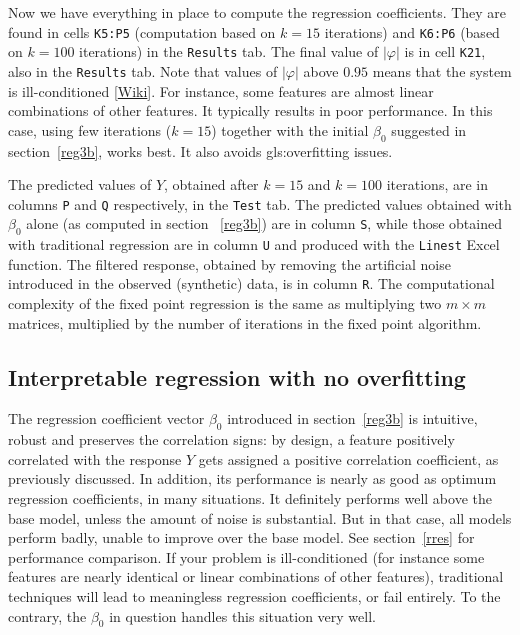 \documentclass[oneside,10pt]{book}
\begin{document}
Now we have everything in place to compute the regression coefficients. They are found in cells \texttt{K5:P5} (computation based on $k=15$ iterations) and  \texttt{K6:P6} (based on $k=100$ iterations) in the \texttt{Results} tab. The final value of $|\varphi|$ is in cell \texttt{K21}, also in the \texttt{Results} tab. Note that values of $|\varphi|$ above $0.95$ means that the system is \textcolor{index}{ill-conditioned} [\href{https://en.wikipedia.org/wiki/Condition_number}{Wiki}]. For instance, some features are almost linear combinations of other features. It typically results in poor performance. In this case, using few iterations ($k=15$) together with the initial $\beta_0$ suggested in section~\ref{reg3b}, works best. It also avoids \gls{gls:overfitting} issues.

The predicted values of $Y$, obtained after $k=15$ and $k=100$ iterations, are in columns \texttt{P} and \texttt{Q} respectively, in the \texttt{Test} tab. The predicted values obtained with $\beta_0$ alone (as computed in section ~\ref{reg3b}) are in column \texttt{S}, while those obtained with traditional regression are in column \texttt{U} and produced with the \texttt{Linest} Excel function. The filtered response, obtained by removing the artificial noise introduced in the observed (synthetic) data, is in column \texttt{R}. The computational complexity of the fixed point regression is the same as multiplying two $m\times m$ matrices, multiplied by the number of iterations in the fixed point algorithm. 


\subsection{Interpretable regression with no overfitting}

The regression coefficient vector $\beta_0$ introduced in section~\ref{reg3b} is intuitive, robust and preserves the correlation signs: by design, a feature positively correlated with the
response $Y$ gets assigned a positive correlation coefficient, as previously discussed.  In addition, its performance is nearly as good as optimum regression
 coefficients,  in many situations. It definitely performs well above the base model, unless the amount of noise is substantial. But in that case, all models perform badly, unable to
improve over the base model. See section~\ref{rres} for performance comparison. If your problem is ill-conditioned (for instance some features are nearly identical or linear combinations of other features), traditional techniques will lead to meaningless regression coefficients, or fail entirely. To the contrary, the $\beta_0$ in question handles this situation very well.
\end{document}
